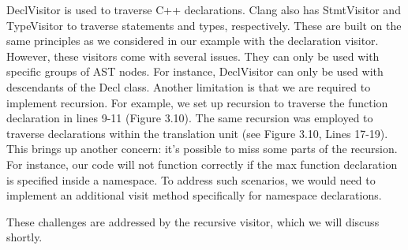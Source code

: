 DeclVisitor is used to traverse C++ declarations. Clang also has StmtVisitor and TypeVisitor to traverse statements and types, respectively. These are built on the same principles as we considered in our example with the declaration visitor. However, these visitors come with several issues. They can only be used with specific groups of AST nodes. For instance, DeclVisitor can only be used with descendants of the Decl class. Another limitation is that we are required to implement recursion. For example, we set up recursion to traverse the function declaration in lines 9-11 (Figure 3.10). The same recursion was employed to traverse declarations within the translation unit (see Figure 3.10, Lines 17-19). This brings up another concern: it’s possible to miss some parts of the recursion. For instance, our code will not function correctly if the max function declaration is specified inside a namespace. To address such scenarios, we would need to implement an additional visit method specifically for namespace declarations.

These challenges are addressed by the recursive visitor, which we will discuss shortly.


















